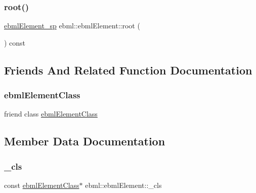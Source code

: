 \subsubsection{\texorpdfstring{root()}{root()}}
{\footnotesize\ttfamily \mbox{\hyperlink{namespaceebml_adad533b7705a16bb360fe56380c5e7be}{ebml\+Element\+\_\+sp}} ebml\+::ebml\+Element\+::root (\begin{DoxyParamCaption}{ }\end{DoxyParamCaption}) const}



\subsection{Friends And Related Function Documentation}
\mbox{\label{classebml_1_1ebmlElement_a59f545ad07cbee7ac3e53dcc0f675c78}} 
\subsubsection{\texorpdfstring{ebml\+Element\+Class}{ebmlElementClass}}
{\footnotesize\ttfamily friend class \mbox{\hyperlink{classebml_1_1ebmlElementClass}{ebml\+Element\+Class}}\hspace{0.3cm}{\ttfamily [friend]}}



\subsection{Member Data Documentation}
\mbox{\label{classebml_1_1ebmlElement_a8599f2d1b37594d8ee97fc55e10d7c89}} 
\subsubsection{\texorpdfstring{\+\_\+cls}{\_cls}}
{\footnotesize\ttfamily const \mbox{\hyperlink{classebml_1_1ebmlElementClass}{ebml\+Element\+Class}}$\ast$ ebml\+::ebml\+Element\+::\+\_\+cls\hspace{0.3cm}{\ttfamily [protected]}}

